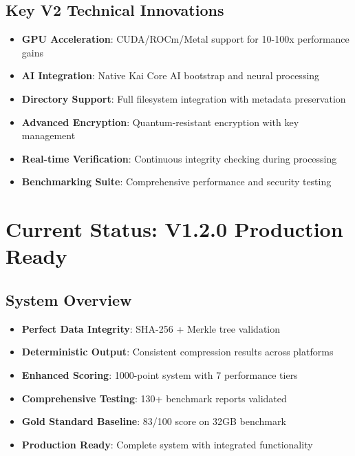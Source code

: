 \documentclass[12pt,a4paper]{article}
\begin{document}
\subsection{Key V2 Technical Innovations}
\begin{itemize}
    \item \textbf{GPU Acceleration}: CUDA/ROCm/Metal support for 10-100x performance gains
    \item \textbf{AI Integration}: Native Kai Core AI bootstrap and neural processing
    \item \textbf{Directory Support}: Full filesystem integration with metadata preservation
    \item \textbf{Advanced Encryption}: Quantum-resistant encryption with key management
    \item \textbf{Real-time Verification}: Continuous integrity checking during processing
    \item \textbf{Benchmarking Suite}: Comprehensive performance and security testing
\end{itemize}

\section{Current Status: V1.2.0 Production Ready}

\subsection{System Overview}
\begin{itemize}
    \item \textbf{Perfect Data Integrity}: SHA-256 + Merkle tree validation
    \item \textbf{Deterministic Output}: Consistent compression results across platforms
    \item \textbf{Enhanced Scoring}: 1000-point system with 7 performance tiers
    \item \textbf{Comprehensive Testing}: 130+ benchmark reports validated
    \item \textbf{Gold Standard Baseline}: 83/100 score on 32GB benchmark
    \item \textbf{Production Ready}: Complete system with integrated functionality
\end{itemize}
\end{document}
